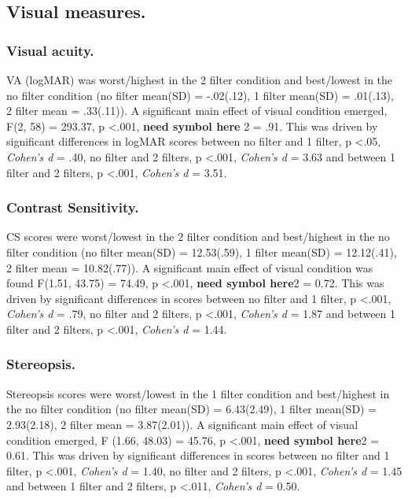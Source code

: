 \documentclass[
  english,
  man,floatsintext]{apa6}
\begin{document}
\hypertarget{visual-measures.}{%
\subsection{Visual measures.}\label{visual-measures.}}

\hypertarget{visual-acuity.}{%
\subsubsection{Visual acuity.}\label{visual-acuity.}}

VA (logMAR) was worst/highest in the 2 filter condition and best/lowest in the no filter condition (no filter mean(SD) = -.02(.12), 1 filter mean(SD) = .01(.13), 2 filter mean = .33(.11)).
A significant main effect of visual condition emerged, F(2, 58) = 293.37, p \textless{}.001, \textbf{need symbol here} 2 = .91.
This was driven by significant differences in logMAR scores between no filter and 1 filter, p \textless{}.05, \emph{Cohen's d} = .40, no filter and 2 filters, p \textless{}.001, \emph{Cohen's d} = 3.63 and between 1 filter and 2 filters, p \textless{}.001, \emph{Cohen's d} = 3.51.

\hypertarget{contrast-sensitivity.}{%
\subsubsection{Contrast Sensitivity.}\label{contrast-sensitivity.}}

CS scores were worst/lowest in the 2 filter condition and best/highest in the no filter condition (no filter mean(SD) = 12.53(.59), 1 filter mean(SD) = 12.12(.41), 2 filter mean = 10.82(.77)).
A significant main effect of visual condition was found F(1.51, 43.75) = 74.49, p \textless{}.001, \textbf{need symbol here}2 = 0.72.
This was driven by significant differences in scores between no filter and 1 filter, p \textless{}.001, \emph{Cohen's d} = .79, no filter and 2 filters, p \textless{}.001, \emph{Cohen's d} = 1.87 and between 1 filter and 2 filters, p \textless{}.001, \emph{Cohen's d} = 1.44.

\hypertarget{stereopsis.}{%
\subsubsection{Stereopsis.}\label{stereopsis.}}

Stereopsis scores were worst/lowest in the 1 filter condition and best/highest in the no filter condition (no filter mean(SD) = 6.43(2.49), 1 filter mean(SD) = 2.93(2.18), 2 filter mean = 3.87(2.01)).
A significant main effect of visual condition emerged, F (1.66, 48.03) = 45.76, p \textless{}.001, \textbf{need symbol here}2 = 0.61.
This was driven by significant differences in scores between no filter and 1 filter, p \textless{}.001, \emph{Cohen's d} = 1.40, no filter and 2 filters, p \textless{}.001, \emph{Cohen's d} = 1.45 and between 1 filter and 2 filters, p \textless{}.011, \emph{Cohen's d} = 0.50.
\end{document}
